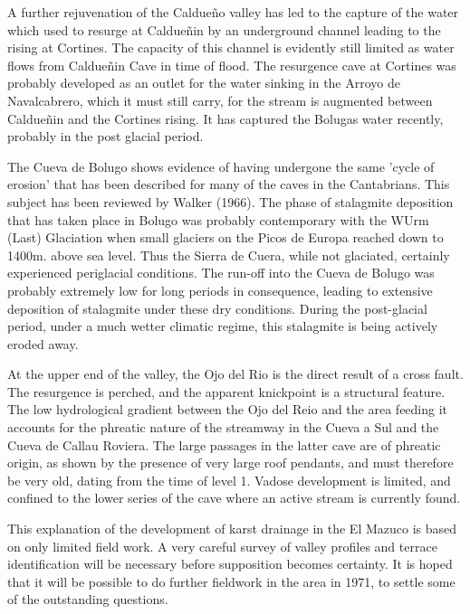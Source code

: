 \documentclass[11pt, a4paper, twoside]{memoir}
\begin{document}
A further rejuvenation of the Caldueño valley has led to the capture of the water which used to resurge at Caldueñin by an underground channel leading to the rising at Cortines. The capacity of this channel is evidently still limited as water flows from Caldueñin Cave in time of flood. The resurgence cave at Cortines was probably developed as an outlet for the water sinking in the Arroyo de Navalcabrero, which it must still carry, for the stream is augmented between Caldueñin and the Cortines rising. It has captured the Bolugas water recently, probably in the post glacial period.

The Cueva de Bolugo shows evidence of having undergone the same 'cycle of erosion' that has been described for many of the caves in the Cantabrians. This subject has been reviewed by Walker (1966). The phase of stalagmite deposition that has taken place in Bolugo was probably contemporary with the WUrm (Last) Glaciation when small glaciers on the Picos de Europa reached down to 1400m. above sea level. Thus the Sierra de Cuera, while not glaciated, certainly experienced periglacial conditions. The run-off into the Cueva de Bolugo was probably extremely low for long periods in consequence, leading to extensive deposition of stalagmite under these dry conditions. During the post-glacial period, under a much wetter climatic regime, this stalagmite is being actively eroded away.

At the upper end of the valley, the Ojo del Rio is the direct result of a cross fault. The resurgence is perched, and the apparent knickpoint is a structural feature. The low hydrological gradient between the Ojo del Reio and the area feeding it accounts for the phreatic nature of the streamway in the Cueva a Sul and the Cueva de Callau Roviera. The large passages in the latter cave are of phreatic origin, as shown by the presence of very large roof pendants, and must therefore be very old, dating from the time of level 1. Vadose development is limited, and confined to the lower series of the cave where an active stream is currently found.

This explanation of the development of karst drainage in the El Mazuco is based on only limited field work. A very careful survey of valley profiles and terrace identification will be necessary before supposition becomes certainty. It is hoped that it will be possible to do further fieldwork in the area in 1971, to settle some of the outstanding questions.
\end{document}
